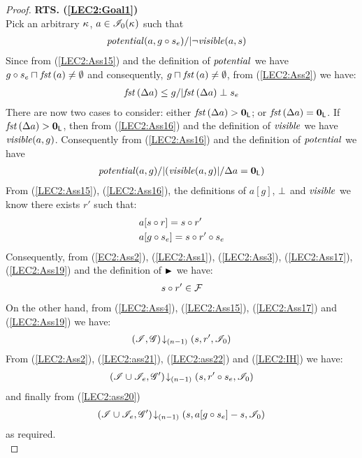 \begin{lemma}
\begin{proof}
\noindent\textbf{RTS. (\ref{LEC2:Goal1})}\\
Pick an arbitrary $\kappa_{}$, $a \in \mathscr{I}_0(\kappa_{})$ such that
%
\begin{align}
	& \mathit{potential}(a, g \circ s_e) /| \neg\mathit{visible}(a, s) \label{LEC2:Ass15}
\end{align}
Since from (\ref{LEC2:Ass15}) and the definition of $\mathit{potential}$ we have $g \circ s_e \sqcap_{} \mathit{fst}\left(a\right) \not= \emptyset$ and consequently, $g \sqcap_{} \mathit{fst}\left(a\right) \not= \emptyset$, from (\ref{LEC2:Ass2}) we have:
%
\begin{align}
	\mathit{fst}\left(\Delta {a}\right) \leq g /| \mathit{fst}\left(\Delta {a}\right) \mathrel{\bot} s_e \label{LEC2:Ass16}
\end{align}
% 
There are now two cases to consider: either $\mathit{fst}\left(\Delta {a}\right) > \mathbf{0}_{\textsf{L}}$; or $\mathit{fst}\left(\Delta {a}\right) = \mathbf{0}_{\textsf{L}}$.
If $\mathit{fst}\left(\Delta {a}\right) > \mathbf{0}_{\textsf{L}}$, then from (\ref{LEC2:Ass16}) and the definition of $\mathit{visible}$ we have $\mathit{visible}(a, g)$. Consequently from (\ref{LEC2:Ass16}) and the definition of $\mathit{potential}$ we have
%
\begin{align}
	\mathit{potential}(a, g) /| (\mathit{visible}(a, g) |/ \Delta {a} = \mathbf{0}_{\textsf{L}}) \label{LEC2:Ass17}
\end{align}
From (\ref{LEC2:Ass15}), (\ref{LEC2:Ass16}), the definitions of $a[g]$, $\mathrel{\bot}$ and $\mathit{visible}$ we know there exists $r'$ such that: 
%
\begin{align}
	& a[s \circ r] = s \circ r' \label{LEC2:Ass19}\\
	& a[g \circ s_e] = s \circ r' \circ s_e \label{LEC2:ass20}
\end{align}
%
Consequently, from (\ref{EC2:Ass2}), (\ref{LEC2:Ass1}), (\ref{LEC2:Ass3}), (\ref{LEC2:Ass17}), (\ref{LEC2:Ass19}) and the definition of $\strictfences$ we have:
%
\begin{align}
	s \circ r' \in \mathcal{F}_{}  \label{LEC2:ass21}
\end{align}
%
On the other hand, from (\ref{LEC2:Ass4}), (\ref{LEC2:Ass15}), (\ref{LEC2:Ass17}) and (\ref{LEC2:Ass19}) we have:
%
\begin{align}
	\left(\mathscr{I}, \mathscr{G}\right) \!\downarrow_{(n-1)} \left(s, r', \mathscr{I}_0\right) \label{LEC2:ass22}
\end{align}
From (\ref{LEC2:Ass2}), (\ref{LEC2:ass21}), (\ref{LEC2:ass22}) and (\ref{LEC2:IH}) we have:
%
\begin{align*}
	\left(\mathscr{I} \cup \mathscr{I}_{e}, \mathscr{G}'\right) \!\downarrow_{(n-1)} \left(s, r' \circ s_e, \mathscr{I}_0\right)
\end{align*}
%
and finally from (\ref{LEC2:ass20})
%
\begin{align*}
	\left(\mathscr{I} \cup \mathscr{I}_{e}, \mathscr{G}'\right) \!\downarrow_{(n-1)} \left(s, a[g \circ s_e] - s, \mathscr{I}_0\right)
\end{align*}
%
as required.\\
%
%
%


\end{proof}
\end{lemma}
